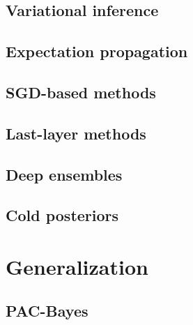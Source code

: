 \subsection{Variational inference}


\subsection{Expectation propagation}


\subsection{SGD-based methods}


\subsection{Last-layer methods}


\subsection{Deep ensembles}


\subsection{Cold posteriors}

\section{Generalization}



\subsection{PAC-Bayes}